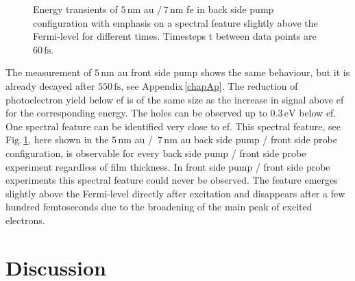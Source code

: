 \documentclass[a4paper,12pt,twoside]{article}
\begin{document}
	\begin{figure}[H]
		\caption{Energy transients of $5\,\mathrm{\mbox{nm}}$ \gls{au} /\,$7\,\mathrm{\mbox{nm}}$ \gls{fe} in back side pump configuration with emphasis on a spectral feature slightly above the Fermi-level for different times. Timesteps \textDelta t between data points are $60\,\mathrm{fs}$.}
    		\label{specfeature}
	\end{figure}The measurement of $5\,\mathrm{\mbox{nm}}$ \gls{au} front side pump shows the same behaviour, but it is already decayed after $550\,\mathrm{\mbox{fs}}$, see Appendix\,\ref{chapAp}. The reduction of photoelectron yield below \gls{ef} is of the same size as the increase in signal above \gls{ef} for the corresponding energy. The holes can be observed up to $0.3\,\mathrm{eV}$ below \gls{ef}. One spectral feature can be identified very close to \gls{ef}.
This spectral feature, see Fig.\,\ref{specfeature}, here shown in the $5\,\mathrm{\mbox{nm}}$ \gls{au} /\, $7\,\mathrm{\mbox{nm}}$ \gls{au} back side pump / front side probe configuration, is observable for every back side pump / front side probe experiment regardless of film thickness. In front side pump / front side probe experiments this spectral feature could never be observed.
The feature emerges slightly above the Fermi-level directly after excitation and disappears after a few hundred femtoseconds due to the broadening of the main peak of excited electrons.
    \newpage
    \section{Discussion}
        \label{Dchap}
\end{document}
